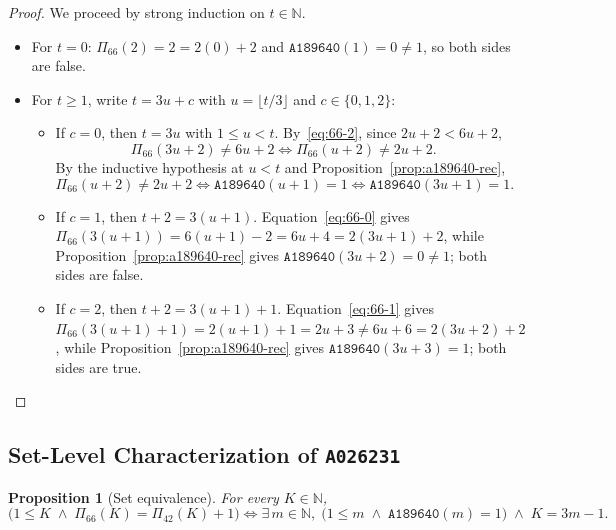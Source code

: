\documentclass[11pt]{article}
\newtheorem{proposition}[theorem]{Proposition}
\theoremstyle{definition}
\newcommand{\N}{\mathbb{N}}
\newcommand{\seq}[1]{\texttt{#1}}
\begin{document}
\begin{proof}
We proceed by strong induction on $t \in \N$.
\begin{itemize}
\item For $t = 0$: $\Pi_{66}(2) = 2 = 2(0) + 2$ and $\seq{A189640}(1) = 0 \ne 1$, so both sides are false.
\item For $t \ge 1$, write $t = 3u + c$ with $u = \lfloor t/3 \rfloor$ and $c \in \{0, 1, 2\}$:
\begin{itemize}
\item If $c = 0$, then $t = 3u$ with $1 \le u < t$. By~\eqref{eq:66-2}, since $2u + 2 < 6u + 2$,
\[
\Pi_{66}(3u + 2) \ne 6u + 2 \iff \Pi_{66}(u + 2) \ne 2u + 2.
\]
By the inductive hypothesis at $u < t$ and Proposition~\ref{prop:a189640-rec},
\[
\Pi_{66}(u + 2) \ne 2u + 2 \iff \seq{A189640}(u + 1) = 1 \iff \seq{A189640}(3u + 1) = 1.
\]
\item If $c = 1$, then $t + 2 = 3(u + 1)$. Equation~\eqref{eq:66-0} gives $\Pi_{66}(3(u+1)) = 6(u+1) - 2 = 6u + 4 = 2(3u + 1) + 2$, while Proposition~\ref{prop:a189640-rec} gives $\seq{A189640}(3u + 2) = 0 \ne 1$; both sides are false.
\item If $c = 2$, then $t + 2 = 3(u + 1) + 1$. Equation~\eqref{eq:66-1} gives $\Pi_{66}(3(u+1) + 1) = 2(u+1) + 1 = 2u + 3 \ne 6u + 6 = 2(3u + 2) + 2$, while Proposition~\ref{prop:a189640-rec} gives $\seq{A189640}(3u + 3) = 1$; both sides are true. \qedhere
\end{itemize}
\end{itemize}
\end{proof}

\subsection{Set-Level Characterization of \seq{A026231}}

\begin{proposition}[Set equivalence]
\label{prop:set-equiv}
For every $K \in \N$,
\[
\bigl(1 \le K \;\wedge\; \Pi_{66}(K) = \Pi_{42}(K) + 1\bigr) \iff \exists\, m \in \N,\; \bigl(1 \le m \;\wedge\; \seq{A189640}(m) = 1\bigr) \;\wedge\; K = 3m - 1.
\]
\end{proposition}
\end{document}
